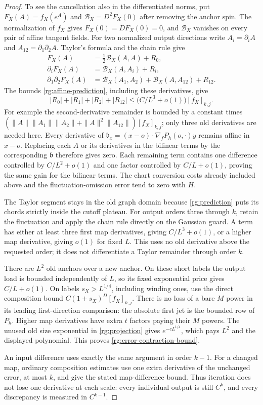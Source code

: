\begin{proof}
To see the cancellation also in the differentiated norms, put
$F_X(A)=f_X(e^A)$ and $\mathcal B_X=D^2F_X(0)$ after removing the
anchor spin.  The normalization of $f_X$ gives
$F_X(0)=DF_X(0)=0$, and $\mathcal B_X$ vanishes on every pair of
affine tangent fields.  For two normalized output directions write
$A_i=\partial_iA$ and $A_{12}=\partial_1\partial_2A$.  Taylor's
formula and the chain rule give
\begin{align*}
 F_X(A)&=\tfrac12\mathcal B_X(A,A)+R_0,\\
 \partial_iF_X(A)&=\mathcal B_X(A,A_i)+R_i,\\
 \partial_1\partial_2F_X(A)
   &=\mathcal B_X(A_1,A_2)+\mathcal B_X(A,A_{12})+R_{12}.
\end{align*}
The bounds \eqref{rg:affine-prediction}, including these derivatives,
give
\[
 |R_0|+|R_1|+|R_2|+|R_{12}|
       \le \bigl(C/L^3+o(1)\bigr)[f_X]_{k,j}.
\]
For example the second-derivative remainder is bounded by a constant
times
$(\|A\|\|A_1\|\|A_2\|+\|A\|^2\|A_{12}\|)[f_X]_{k,j}$;
only three old derivatives are needed here.  Every derivative of
$\mathfrak b_x=(x-o)\cdot\nabla_fP_h(o,\cdot)y$ remains affine in
$x-o$.  Replacing each $A$ or its derivatives in the bilinear terms
by the corresponding $\mathfrak b$ therefore gives zero.  Each
remaining term contains one difference controlled by $C/L^2+o(1)$
and one factor controlled by $C/L+o(1)$, proving the same gain for
the bilinear terms.  The chart conversion costs already included above
and the fluctuation-omission error tend to zero with $H$.

The Taylor segment stays in the old graph domain because
\eqref{rg:prediction} puts its chords strictly inside the cutoff
plateau.  For output orders three through $k$, retain the fluctuation
and apply the chain rule directly on the Gaussian guard.  A term has
either at least three first map derivatives, giving $C/L^3+o(1)$,
or a higher map derivative, giving $o(1)$ for fixed $L$.
This uses no old derivative above the requested order; it does not
differentiate a Taylor remainder through order $k$.

There are $L^2$ old anchors over a new anchor.  On these short
labels the output load is bounded independently of $L$, so its
fixed exponential price gives $C/L+o(1)$.  On labels
$s_X>L^{1/4}$, including winding ones, use the direct composition
bound $C(1+s_X)^D[f_X]_{k,j}$.  There is no loss of a bare $M$
power in its leading first-direction comparison: the absolute
first jet is the bounded row of $P_h$.  Higher map derivatives
have extra $t$ factors paying their $M$ powers.  The unused old
size exponential in \eqref{rg:projection} gives
$e^{-cL^{1/4}}$, which pays $L^2$ and the displayed polynomial.
This proves \eqref{rg:error-contraction-bound}.

An input difference uses exactly the same argument in order
$k-1$.  For a changed map, ordinary composition estimates use one
extra derivative of the unchanged error, at most $k$, and give the
stated map-difference bound.  Thus iteration does not lose one
derivative at each scale: every individual output is still $C^k$,
and every discrepancy is measured in $C^{k-1}$.
\end{proof}

